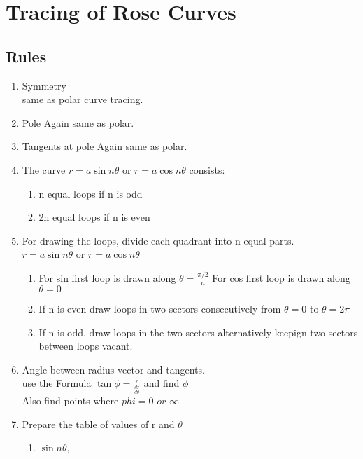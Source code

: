\documentclass[12pt]{article}
\begin{document}
\clearpage
\tableofcontents
\clearpage

\section{Tracing of Rose Curves}

\subsection{Rules}

\begin{enumerate}
    \item Symmetry\\
        same as polar curve tracing. 
    \item Pole
        Again same as polar. 
    \item Tangents at pole
        Again same as polar. 
    \item The curve \(r = a \sin n \theta\) or
    \(r = a \cos n \theta\)  consists: 
    \begin{enumerate}
        \item n equal loops if n is odd
        \item 2n equal loops if n is even
    \end{enumerate}
    \item For drawing the loops, divide each quadrant into n equal parts.\\
    \(r = a \sin n \theta\) or
    \(r = a \cos n \theta\) 
    
    \begin{enumerate}
        \item For sin first loop is drawn along $\theta = \frac{\pi/2}{n}$
         For cos first loop is drawn along $\theta = 0$
        \item If n is even draw loops in two sectors consecutively from $\theta = 0$ to $\theta = 2\pi$
        \item If n is odd, draw loops in the two sectors alternatively keepign two sectors between loops vacant.  
        \end{enumerate}

    \item Angle between radius vector and tangents.\\
    use the Formula $\tan\phi = \frac{r}{\frac{dr}{d\theta}}$ and find $\phi$\\
    Also find points where $phi = 0 \textit{ or } \infty $
    \item Prepare the table of values of r and $\theta$
    \begin{enumerate}
        \item $\sin n\theta,$ \\
        

\end{enumerate}
\end{enumerate}
\end{document}
